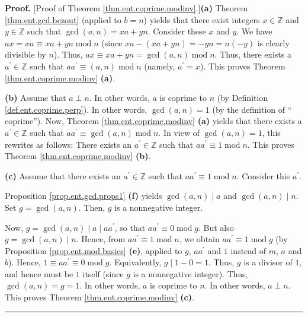 \documentclass[numbers=enddot,12pt,final,onecolumn,notitlepage]{scrartcl}%
\numberwithin{exer}{subsection}
\theoremstyle{definition}
\newenvironment{proof}[1][Proof]{\noindent\textbf{#1.} }{\ \rule{0.5em}{0.5em}}
\begin{document}
\begin{proof}
[Proof of Theorem \ref{thm.ent.coprime.modinv}.]\textbf{(a)} Theorem
\ref{thm.ent.gcd.bezout} (applied to $b=n$) yields that there exist integers
$x\in\mathbb{Z}$ and $y\in\mathbb{Z}$ such that $\gcd\left(  a,n\right)
=xa+yn$. Consider these $x$ and $y$. We have $ax=xa\equiv
xa+yn\operatorname{mod}n$ (since $xa-\left(  xa+yn\right)  =-yn=n\left(
-y\right)  $ is clearly divisible by $n$). Thus, $ax\equiv xa+yn=\gcd\left(
a,n\right)  \operatorname{mod}n$. Thus, there exists a $a^{\prime}%
\in\mathbb{Z}$ such that $aa^{\prime}\equiv\left(  a,n\right)
\operatorname{mod}n$ (namely, $a^{\prime}=x$). This proves Theorem
\ref{thm.ent.coprime.modinv} \textbf{(a)}.

\textbf{(b)} Assume that $a\perp n$. In other words, $a$ is coprime to $n$ (by
Definition \ref{def.ent.coprime.perp}). In other words, $\gcd\left(
a,n\right)  =1$ (by the definition of \textquotedblleft
coprime\textquotedblright). Now, Theorem \ref{thm.ent.coprime.modinv}
\textbf{(a)} yields that there exists a $a^{\prime}\in\mathbb{Z}$ such that
$aa^{\prime}\equiv\gcd\left(  a,n\right)  \operatorname{mod}n$. In view of
$\gcd\left(  a,n\right)  =1$, this rewrites as follows: There exists an
$a^{\prime}\in\mathbb{Z}$ such that $aa^{\prime}\equiv1\operatorname{mod}n$.
This proves Theorem \ref{thm.ent.coprime.modinv} \textbf{(b)}.

\textbf{(c)} Assume that there exists an $a^{\prime}\in\mathbb{Z}$ such that
$aa^{\prime}\equiv1\operatorname{mod}n$. Consider this $a^{\prime}$.

Proposition \ref{prop.ent.gcd.props1} \textbf{(f)} yields $\gcd\left(
a,n\right)  \mid a$ and $\gcd\left(  a,n\right)  \mid n$. Set $g=\gcd\left(
a,n\right)  $. Then, $g$ is a nonnegative integer.

Now, $g=\gcd\left(  a,n\right)  \mid a\mid aa^{\prime}$, so that $aa^{\prime
}\equiv0\operatorname{mod}g$. But also $g=\gcd\left(  a,n\right)  \mid n$.
Hence, from $aa^{\prime}\equiv1\operatorname{mod}n$, we obtain $aa^{\prime
}\equiv1\operatorname{mod}g$ (by Proposition \ref{prop.ent.mod.basics}
\textbf{(e)}, applied to $g$, $aa^{\prime}$ and $1$ instead of $m$, $a$ and
$b$). Hence, $1\equiv aa^{\prime}\equiv0\operatorname{mod}g$. Equivalently,
$g\mid1-0=1$. Thus, $g$ is a divisor of $1$, and hence must be $1$ itself
(since $g$ is a nonnegative integer). Thus, $\gcd\left(  a,n\right)  =g=1$. In
other words, $a$ is coprime to $n$. In other words, $a\perp n$. This proves
Theorem \ref{thm.ent.coprime.modinv} \textbf{(c)}.
\end{proof}
\end{document}

